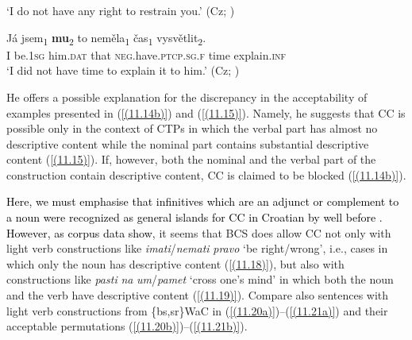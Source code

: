 \begin{exe}\ex
\begin{xlist}
\end{xlist}
\glt ‘I do not have any right to restrain you.’
\hfill (Cz; \citealt[72]{Junghanns02})

\ex\label{(11.15)}
\gll Já jsem\textsubscript{1} \textbf{mu}\textsubscript{2} to neměla\textsubscript{1} čas\textsubscript{1} vysvětlit\textsubscript{2}. \\
 I be.1\textsc{sg} him.\textsc{dat} that \textsc{neg}.have.\textsc{ptcp}.\textsc{sg}.\textsc{f} time explain.\textsc{inf} \\
\glt ‘I did not have time to explain it to him.’
\hfill (Cz; \citealt[73]{Junghanns02})
\end{exe}

\noindent He offers a possible explanation for the discrepancy in the acceptability of examples presented in (\ref{(11.14b)}) and (\ref{(11.15)}). Namely, he suggests that CC is possible only in the context of CTPs in which the verbal part has almost no descriptive content while the nominal part contains substantial descriptive content (\ref{(11.15)}). If, however, both the nominal and the verbal part of the construction contain descriptive content, CC is claimed to be blocked (\ref{(11.14b)}).

\textcolor{black}{Here, we must emphasise that infinitives which are an adjunct or complement to a noun were recognized as general islands for CC in Croatian by \citet[448f]{CavarWilder94} well before \citet{Junghanns02}. However, as corpus data show}, it seems that BCS does allow CC not only with light verb constructions like \textit{imati}/\textit{nemati} \textit{pravo} ‘be right/wrong’, i.e., cases in which only the noun has descriptive content (\ref{(11.18)}), but also with constructions like \textit{pasti} \textit{na} \textit{um}/\textit{pamet} ‘cross one’s mind’ in which both the noun and the verb have descriptive content (\ref{(11.19)}). Compare also sentences with light verb constructions from \{bs,sr\}WaC in (\ref{(11.20a)})--(\ref{(11.21a)}) and their acceptable permutations (\ref{(11.20b)})--(\ref{(11.21b)}). 

